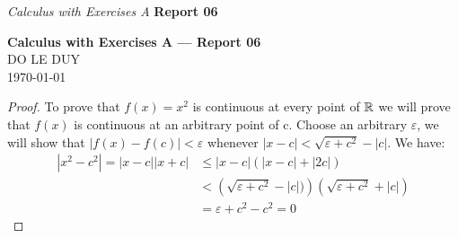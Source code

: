 
\newcommand{\myclass}{Calculus with Exercises A}
\newcommand{\myname}{DO LE DUY}
\newcommand{\myhwtype}{Report 06}
\newcommand{\questiontype}{Problem}
\newcommand{\writtensection}{6}
\headrule
\header{{\myname}}%
{\emph{\myclass}}%
{\textbf{\myhwtype }}


\thispagestyle{empty}
\begin{center}
  {\Large \textbf{\myclass{} — \myhwtype{} }} \\
  {\myname{} } \\
  \today
\end{center}

\begin{numedquestion}
\begin{proof}

  To prove that $f(x) = x^2$ is continuous at every point of $\mathbb{R}$ we will prove that $f(x)$ is continuous at an arbitrary point of c. \newline
  Choose an arbitrary $\varepsilon$, we will show that $|f(x) - f(c)| < \varepsilon$ whenever $|x-c| < \sqrt{\varepsilon + c^2} - |c|$.\newline
  We have: 
\begin{align*}
  |x^2 - c^2| = |x-c||x+c| &\leq |x-c|\left(|x-c| + |2c|\right) \\
  &< \left(\sqrt{\varepsilon + c^2} - |c|)\right)\left(\sqrt{\varepsilon + c^2} + |c|\right) \\
  &=\varepsilon + c^2 - c^2 = 0
\end{align*}
  
\end{proof}
\end{numedquestion}
  
